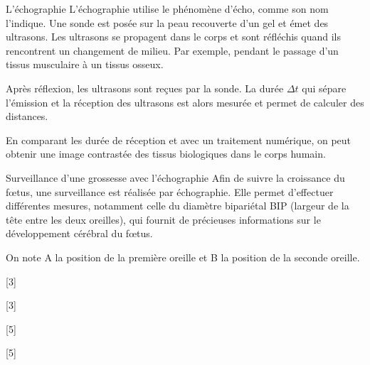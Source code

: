 \begin{doc}{L'échographie}
  L'échographie utilise le phénomène d'écho, comme son nom l'indique.
  Une sonde est posée sur la peau recouverte d'un gel et émet des ultrasons.
  Les ultrasons se propagent dans le corps et sont réfléchis quand ils rencontrent un changement de milieu.
  Par exemple, pendant le passage d'un tissus musculaire à un tissus osseux.

  Après réflexion, les ultrasons sont reçues par la sonde.
  La durée $\Delta t$ qui sépare l'émission et la réception des ultrasons est alors mesurée et permet de calculer des distances.

  En comparant les durée de réception et avec un traitement numérique, on peut obtenir une image contrastée des tissus biologiques dans le corps humain.

\end{doc}

\begin{doc}{Surveillance d'une grossesse avec l'échographie}
  Afin de suivre la croissance du fœtus, une surveillance est réalisée par échographie.
  Elle permet d’effectuer différentes mesures, notamment celle du diamètre bipariétal BIP
  (largeur de la tête entre les deux oreilles),
  qui fournit de précieuses informations sur le développement cérébral du fœtus.
  
  On note A la position de la première oreille et B la position de la seconde oreille.
\end{doc}


[3]

[3]

[5]

[5]